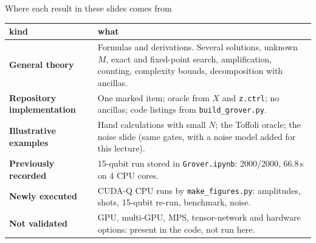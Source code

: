 \documentclass[aspectratio=169,11pt]{beamer}
\newcommand{\key}[1]{{\color{qdark}\textbf{#1}}}
\begin{document}
\begin{frame}{Where each result in these slides comes from}
  \centering\small
  \begin{tabular}{p{}p{}}
    \toprule
    kind & what\\
    \midrule
    \key{General theory} & Formulas and derivations. Several solutions, unknown $M$, exact and fixed-point search, amplification, counting, complexity bounds, decomposition with ancillas.\\[1mm]
    \key{Repository implementation} & One marked item; oracle from $X$ and \texttt{z.ctrl}; no ancillas; code listings from \texttt{build\_grover.py}.\\[1mm]
    \key{Illustrative examples} & Hand calculations with small $N$; the Toffoli oracle; the noise slide (same gates, with a noise model added for this lecture).\\[1mm]
    \key{Previously recorded} & 15-qubit run stored in \texttt{Grover.ipynb}: 2000/2000, 66.8\,s on 4 CPU cores.\\[1mm]
    \key{Newly executed} & CUDA-Q CPU runs by \texttt{make\_figures.py}: amplitudes, shots, 15-qubit re-run, benchmark, noise.\\[1mm]
    \key{Not validated} & GPU, multi-GPU, MPS, tensor-network and hardware options: present in the code, not run here.\\
    \bottomrule
  \end{tabular}
\end{frame}
\end{document}

